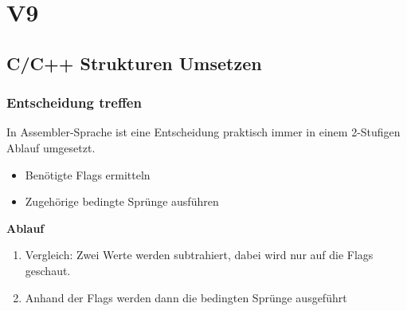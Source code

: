 \section{V9}
\subsection{C/C++ Strukturen Umsetzen}
\subsubsection{Entscheidung treffen}
In Assembler-Sprache ist eine Entscheidung praktisch immer in einem 2-Stufigen Ablauf umgesetzt.
\begin{itemize}
    \item Benötigte Flags ermitteln
    \item Zugehörige bedingte Sprünge ausführen
\end{itemize}

\textbf{Ablauf}\newline
\vspace{-0.5cm}
\begin{enumerate}
    \item Vergleich: Zwei Werte werden subtrahiert, dabei wird nur auf die Flags geschaut.
    \item Anhand der Flags werden dann die bedingten Sprünge ausgeführt
\end{enumerate}














